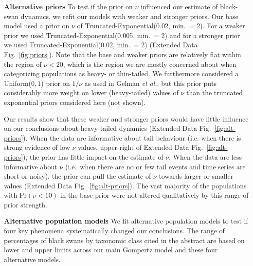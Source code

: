 \textbf{Alternative priors} To test if the prior on \(\nu\) influenced our estimate of black-swan dynamics, we refit our models with weaker and stronger priors. Our base model used a prior on \(\nu\) of Truncated-Exponential(0.02, min.\ = 2). For a weaker prior we used Truncated-Exponential(0.005, min.\ = 2) and for a stronger prior we used Truncated-Exponential(0.02, min.\ = 2) (Extended Data Fig.~\ref{fig:priors}). Note that the base and weaker priors are relatively flat within the region of \(\nu < 20\), which is the region we are mostly concerned about when categorizing populations as heavy- or thin-tailed. We furthermore considered a Uniform(\(0, 1\)) prior on \(1/\nu\) as used in Gelman \emph{et al.}\cite{gelman2014}, but this prior puts considerably more weight on lower (heavy-tailed) values of \(\nu\) than the truncated exponential priors considered here (not shown).

Our results show that these weaker and stronger priors would have little influence on our conclusions about heavy-tailed dynamics (Extended Data Fig.~\ref{fig:alt-priors}). When the data are informative about tail behaviour (i.e. when there is strong evidence of low \(\nu\) values, upper-right of Extended Data Fig.~\ref{fig:alt-priors}), the prior has little impact on the estimate of \(\nu\). When the data are less informative about \(\nu\) (i.e.\ when there are no or few tail events and time series are short or noisy), the prior can pull the estimate of \(\nu\) towards larger or smaller values (Extended Data Fig.~\ref{fig:alt-priors}). The vast majority of the populations with Pr\((\nu < 10)\) in the base prior were not altered qualitatively by this range of prior strength.

\textbf{Alternative population models} We fit alternative population models to test if four key phenomena systematically changed our conclusions. The range of percentages of black swans by taxonomic class cited in the abstract are based on lower and upper limits across our main Gompertz model and these four alternative models.

